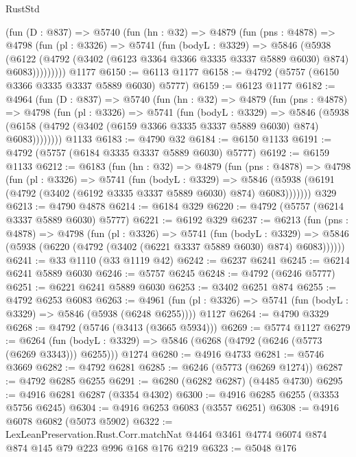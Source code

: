 \begin{lexlean}{RustStd}
\begin{coremodule}
      (fun (D : @837) =>
      @5740
        (fun (hn : @32) =>
        @4879
          (fun (pns : @4878) =>
          @4798
            (fun (pl : @3326) =>
            @5741
              (fun (bodyL : @3329) =>
              @5846
                (@5938
                  (@6122
                    (@4792 (@3402 (@6123 @3364 @3366 @3335 @3337 @5889 @6030) @874) @6083)))))))))
    @1177
@6150 := @6113 @1177
@6158 := @4792 (@5757 (@6150 @3366 @3335 @3337 @5889 @6030) @5777)
@6159 := @6123 @1177
@6182 := @4964
    (fun (D : @837) =>
    @5740
      (fun (hn : @32) =>
      @4879
        (fun (pns : @4878) =>
        @4798
          (fun (pl : @3326) =>
          @5741
            (fun (bodyL : @3329) =>
            @5846
              (@5938 (@6158 (@4792 (@3402 (@6159 @3366 @3335 @3337 @5889 @6030) @874) @6083))))))))
    @1133
@6183 := @4790 @32
@6184 := @6150 @1133
@6191 := @4792 (@5757 (@6184 @3335 @3337 @5889 @6030) @5777)
@6192 := @6159 @1133
@6212 := @6183
    (fun (hn : @32) =>
    @4879
      (fun (pns : @4878) =>
      @4798
        (fun (pl : @3326) =>
        @5741
          (fun (bodyL : @3329) =>
          @5846 (@5938 (@6191 (@4792 (@3402 (@6192 @3335 @3337 @5889 @6030) @874) @6083)))))))
    @329
@6213 := @4790 @4878
@6214 := @6184 @329
@6220 := @4792 (@5757 (@6214 @3337 @5889 @6030) @5777)
@6221 := @6192 @329
@6237 := @6213
    (fun (pns : @4878) =>
    @4798
      (fun (pl : @3326) =>
      @5741
        (fun (bodyL : @3329) =>
        @5846 (@5938 (@6220 (@4792 (@3402 (@6221 @3337 @5889 @6030) @874) @6083))))))
@6241 := @33 @1110 (@33 @1119 @42)
@6242 := @6237 @6241
@6245 := @6214 @6241 @5889 @6030
@6246 := @5757 @6245
@6248 := @4792 (@6246 @5777)
@6251 := @6221 @6241 @5889 @6030
@6253 := @3402 @6251 @874
@6255 := @4792 @6253 @6083
@6263 := @4961
    (fun (pl : @3326) => @5741 (fun (bodyL : @3329) => @5846 (@5938 (@6248 @6255))))
    @1127
@6264 := @4790 @3329
@6268 := @4792 (@5746 (@3413 (@3665 @5934)))
@6269 := @5774 @1127
@6279 := @6264
    (fun (bodyL : @3329) => @5846 (@6268 (@4792 (@6246 (@5773 (@6269 @3343))) @6255)))
    @1274
@6280 := @4916 @4733
@6281 := @5746 @3669
@6282 := @4792 @6281
@6285 := @6246 (@5773 (@6269 @1274))
@6287 := @4792 @6285 @6255
@6291 := @6280 (@6282 @6287) (@4485 @4730)
@6295 := @4916 @6281 @6287 (@3354 @4302)
@6300 := @4916 @6285 @6255 (@3353 @5756 @6245)
@6304 := @4916 @6253 @6083 (@3557 @6251)
@6308 := @4916 @6078 @6082 (@5073 @5902)
@6322 := LexLeanPreservation.Rust.Corr.matchNat
    @4464
    @3461
    @4774
    @6074
    @874
    @874
    @145
    @79
    @223
    @996
    @168
    @176
    @219
@6323 := @5048 @176

\end{coremodule}
\end{lexlean}
